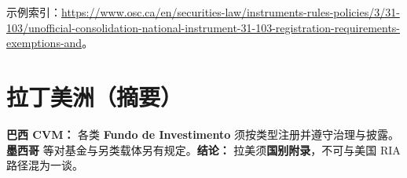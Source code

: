 示例索引：\url{https://www.osc.ca/en/securities-law/instruments-rules-policies/3/31-103/unofficial-consolidation-national-instrument-31-103-registration-requirements-exemptions-and}。

\section{拉丁美洲（摘要）}

\textbf{巴西 CVM：} 各类 \textbf{Fundo de Investimento} 须按类型注册并遵守治理与披露。\textbf{墨西哥} 等对基金与另类载体另有规定。\textbf{结论：} 拉美须\textbf{国别附录}，不可与美国 RIA 路径混为一谈。
